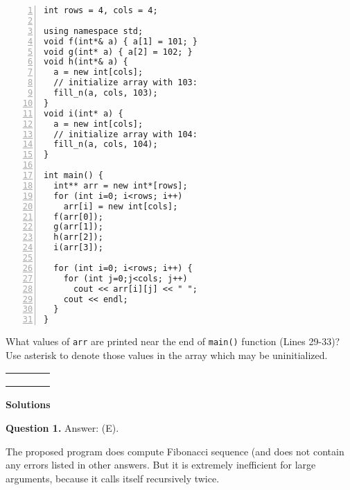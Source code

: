 \documentclass[11pt]{article}
\begin{document}
{{\begin{center}
\begin{minipage}{.8\columnwidth}
\begin{Verbatim}[frame=single,numbers=left]
int rows = 4, cols = 4;

using namespace std;
void f(int*& a) { a[1] = 101; }
void g(int* a) { a[2] = 102; }
void h(int*& a) { 
  a = new int[cols];
  // initialize array with 103:
  fill_n(a, cols, 103); 
}
void i(int* a) { 
  a = new int[cols]; 
  // initialize array with 104:
  fill_n(a, cols, 104); 
}

int main() {
  int** arr = new int*[rows];
  for (int i=0; i<rows; i++) 
    arr[i] = new int[cols];
  f(arr[0]);  
  g(arr[1]);
  h(arr[2]);  
  i(arr[3]);
	
  for (int i=0; i<rows; i++) {
    for (int j=0;j<cols; j++)
      cout << arr[i][j] << " ";
    cout << endl;
  }
}
\end{Verbatim}
\end{minipage}
\end{center}
}


What values of {\tt arr} are printed 
near the end of {\tt main()} function (Lines 29-33)?\\
Use asterisk {\tt *} to denote those values in the array which may be uninitialized.

\vspace{10pt}
\begin{tabular}{|c|c|c|c|} \hline
 \hspace{1em} & \hspace{1em} & \hspace{1em} & \mbox{}\hspace{1em}\mbox{} \\[1.2ex] \hline
 \hspace{1em} & & & \\[1.2ex] \hline
 \hspace{1em} & & & \\[1.2ex] \hline
 \hspace{1em} & & & \\[1.2ex] \hline
\end{tabular}





\newpage

{\bf \Large Solutions}

\vspace{10pt}

\vspace{20pt} 
{\bf Question 1.} Answer: (E).

The proposed program does compute Fibonacci sequence (and does not 
contain any errors listed in other answers.
But it is extremely inefficient for large arguments, because it 
calls itself recursively twice. 


}
\end{document}

